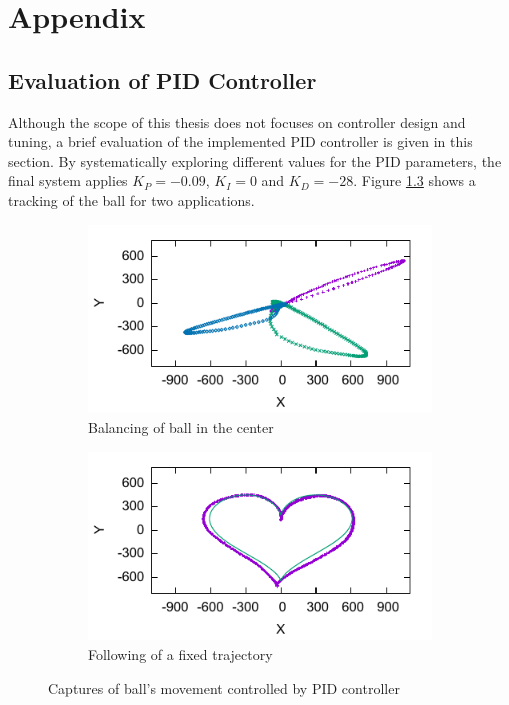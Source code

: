 \chapter{Appendix}
\section{Evaluation of \acs{PID} Controller}
Although the scope of this thesis does not focuses on controller design and
tuning, a brief evaluation of the implemented \ac{PID} controller is given in
this section. By systematically exploring different values for the
\ac{PID} parameters, the final system applies $K_P = -0.09$, $K_I = 0$ and
$K_D = -28$. Figure \ref{fig:demo_pid} shows a tracking of the ball for two
applications.
\begin{figure}
	\centering
	\begin{subfigure}{0.49\textwidth}
		\centering
		\includegraphics[width=\textwidth]{../figures/eval_pos}
		\caption{Balancing of ball in the center}
		\label{fig:eval_pos}
	\end{subfigure}
	\begin{subfigure}{0.49\textwidth}
		\centering
		\includegraphics[width=\textwidth]{../figures/eval_traj}
		\caption{Following of a fixed trajectory}
		\label{fig:eval_traj}
	\end{subfigure}
	\caption{Captures of ball's movement controlled by \acs{PID} controller}
	\label{fig:demo_pid}
\end{figure}
